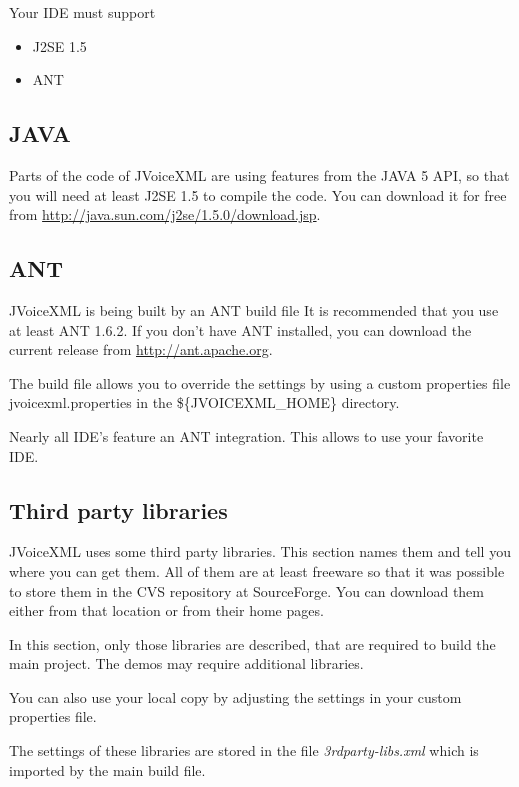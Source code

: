 \documentclass[11pt,a4paper]{article}
\begin{document}
Your IDE must support

\begin{itemize}
\item J2SE 1.5
\item ANT
\end{itemize}

\subsection{JAVA}
\label{sec:java}

Parts of the code of JVoiceXML are using features from the JAVA 5 API, so that
you will need at least J2SE 1.5 to compile the code. You can download it
for free from \url{http://java.sun.com/j2se/1.5.0/download.jsp}.

\subsection{ANT}
\label{sec:ant}

JVoiceXML is being built by an ANT build file It is recommended that
you use at least ANT 1.6.2. 
If you don't have ANT installed, you can download the current release
from \url{http://ant.apache.org}.

The build file allows you to override the settings by using a custom 
properties file jvoicexml.properties in the \$\{JVOICEXML\_HOME\}
directory.

Nearly all IDE's feature an ANT integration. This allows to use
your favorite IDE.

\subsection{Third party libraries}
\label{sec:third-party-libr}

JVoiceXML uses some third party libraries. This section names them and tell
you where you can get them. All of them are at least freeware
so that it was possible to store them in the CVS repository at
SourceForge. You can download them either from that location or
from their home pages. 

In this section, only those libraries are described, that are required
to build the main project. The demos may require additional libraries.

You can also use your local copy by adjusting the settings in your
custom properties file.

The settings of these libraries are stored in the file \emph{3rdparty-libs.xml}
which is imported by the main build file.
\end{document}
